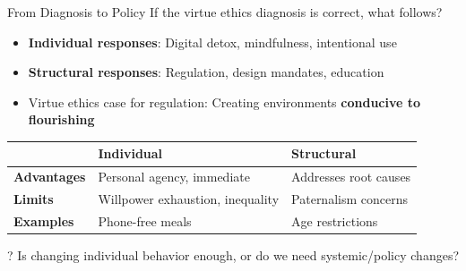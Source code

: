 \documentclass[aspectratio=169]{beamer}
\begin{document}
\begin{frame}{From Diagnosis to Policy}
If the virtue ethics diagnosis is correct, what follows?

\begin{itemize}
    \item \textbf{Individual responses}: Digital detox, mindfulness, intentional use
    \item \textbf{Structural responses}: Regulation, design mandates, education
    \item Virtue ethics case for regulation: Creating environments \textbf{conducive to flourishing}
\end{itemize}

\vspace{0.3cm}
\begin{table}[h]
\centering
\small
\begin{tabular}{>{\bfseries}l p{4cm} p{4cm}}
\toprule
& \textbf{Individual} & \textbf{Structural} \\
\midrule
Advantages & Personal agency, immediate & Addresses root causes \\
Limits & Willpower exhaustion, inequality & Paternalism concerns \\
Examples & Phone-free meals & Age restrictions \\
\bottomrule
\end{tabular}
\end{table}

\begin{alertblock}{?}
Is changing individual behavior enough, or do we need systemic/policy changes?
\end{alertblock}
\end{frame}
\end{document}
